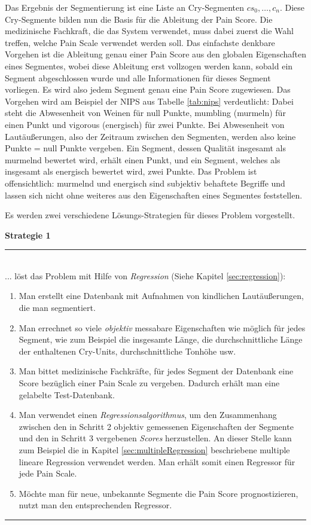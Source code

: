 Das Ergebnis der Segmentierung ist eine Liste an Cry-Segmenten $cs_0,  \ldots , c_n$. Diese Cry-Segmente bilden nun die Basis für die Ableitung der Pain Score. Die medizinische Fachkraft, die das System verwendet, muss dabei zuerst die Wahl treffen, welche Pain Scale verwendet werden soll. Das einfachste denkbare Vorgehen ist die Ableitung genau einer Pain Score aus den globalen Eigenschaften eines Segmentes, wobei diese Ableitung erst vollzogen werden kann, sobald ein Segment abgeschlossen wurde und alle Informationen für dieses Segment vorliegen. Es wird also jedem Segment genau eine Pain Score zugewiesen. Das Vorgehen wird am Beispiel der NIPS aus Tabelle \ref{tab:nips} verdeutlicht: Dabei steht die Abwesenheit von Weinen für null Punkte, \glqq mumbling\grqq{} (murmeln) für einen Punkt und \glqq vigorous\grqq{} (energisch) für zwei Punkte. Bei Abwesenheit von Lautäußerungen, also der Zeitraum zwischen den Segmenten, werden also keine Punkte = null Punkte vergeben. Ein Segment, dessen Qualität insgesamt als \glqq murmelnd\grqq{} bewertet wird, erhält einen Punkt, und ein Segment, welches als insgesamt als \glqq energisch\grqq{} bewertet wird, zwei Punkte. Das Problem ist offensichtlich: \glqq murmelnd\grqq{} und \glqq energisch\grqq{} sind subjektiv behaftete Begriffe und lassen sich nicht ohne weiteres aus den Eigenschaften eines Segmentes feststellen. 

Es werden zwei verschiedene Lösungs-Strategien für dieses Problem vorgestellt. 

\vspace{5mm}

\textbf{Strategie 1} \noindent\rule{0.83\linewidth}{0.3pt}\\
... löst das Problem mit Hilfe von \emph{Regression} (Siehe Kapitel \ref{sec:regression}):
\begin{enumerate}
 \item Man erstellt eine Datenbank mit Aufnahmen von kindlichen Lautäußerungen, die man segmentiert.
 \item Man errechnet \glqq so viele \emph{objektiv} messabare Eigenschaften wie möglich\grqq{} für jedes Segment, wie zum Beispiel die insgesamte Länge, die durchschnittliche Länge der enthaltenen Cry-Units, durchschnittliche Tonhöhe usw.
 \item Man bittet medizinische Fachkräfte, für jedes Segment der Datenbank eine Score bezüglich einer Pain Scale zu vergeben. Dadurch erhält man eine gelabelte Test-Datenbank.
 \item Man verwendet einen \emph{Regressionsalgorithmus}, um den Zusammenhang zwischen den in Schritt 2 objektiv gemessenen Eigenschaften der Segmente und den in Schritt 3 vergebenen \emph{Scores} herzustellen. An dieser Stelle kann zum Beispiel die in Kapitel \ref{sec:multipleRegression} beschriebene multiple lineare Regression verwendet werden. Man erhält somit einen Regressor für jede Pain Scale.
 \item Möchte man für neue, unbekannte Segmente die Pain Score prognostizieren, nutzt man den entsprechenden Regressor.
\end{enumerate}
\noindent\rule{\linewidth}{0.3pt}

